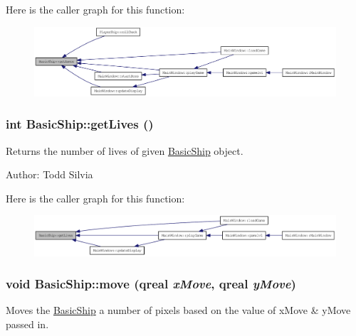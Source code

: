 Here is the caller graph for this function:\nopagebreak
\begin{figure}[H]
\begin{center}
\leavevmode
\includegraphics[width=406pt]{class_basic_ship_a54134d4fe367db9649ffb4bd6a1123b7_icgraph}
\end{center}
\end{figure}
\hypertarget{class_basic_ship_a3df2d25ee4bda266b5087ae6581f0162}{
\subsubsection[{getLives}]{\setlength{\rightskip}{0pt plus 5cm}int BasicShip::getLives ()}}
\label{class_basic_ship_a3df2d25ee4bda266b5087ae6581f0162}
Returns the number of lives of given \hyperlink{class_basic_ship}{BasicShip} object.

Author: Todd Silvia 

Here is the caller graph for this function:\nopagebreak
\begin{figure}[H]
\begin{center}
\leavevmode
\includegraphics[width=404pt]{class_basic_ship_a3df2d25ee4bda266b5087ae6581f0162_icgraph}
\end{center}
\end{figure}
\hypertarget{class_basic_ship_a18da035282b9ecb5f5fdab232bf7ac27}{
\subsubsection[{move}]{\setlength{\rightskip}{0pt plus 5cm}void BasicShip::move (qreal {\em xMove}, \/  qreal {\em yMove})}}
\label{class_basic_ship_a18da035282b9ecb5f5fdab232bf7ac27}
Moves the \hyperlink{class_basic_ship}{BasicShip} a number of pixels based on the value of xMove \& yMove passed in.

